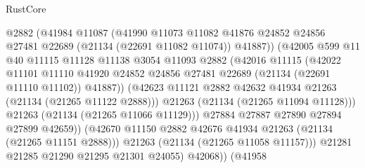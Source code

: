 \begin{lexlean}{RustCore}
\begin{coremodule}
                              @2882
                              (@41984
                                @11087
                                (@41990
                                  @11073
                                  @11082
                                  @41876
                                  @24852
                                  @24856
                                  @27481
                                  @22689
                                  (@21134 (@22691 @11082 @11074))
                                  @41887))
                              (@42005
                                @599
                                @11
                                @40
                                @11115
                                @11128
                                @11138
                                @3054
                                @11093
                                @2882
                                (@42016
                                  @11115
                                  (@42022
                                    @11101
                                    @11110
                                    @41920
                                    @24852
                                    @24856
                                    @27481
                                    @22689
                                    (@21134 (@22691 @11110 @11102))
                                    @41887))
                                (@42623
                                  @11121
                                  @2882
                                  @42632
                                  @41934
                                  @21263
                                  (@21134 (@21265 @11122 @2888)))
                                @21263
                                (@21134 (@21265 @11094 @11128)))
                              @21263
                              (@21134 (@21265 @11066 @11129)))
                            @27884
                            @27887
                            @27890
                            @27894
                            @27899
                            @42659))
                        (@42670 @11150 @2882 @42676 @41934 @21263 (@21134 (@21265 @11151 @2888)))
                        @21263
                        (@21134 (@21265 @11058 @11157)))
                      @21281
                      @21285
                      @21290
                      @21295
                      @21301
                      @24055)
                    @42068))
                (@41958

\end{coremodule}
\end{lexlean}
